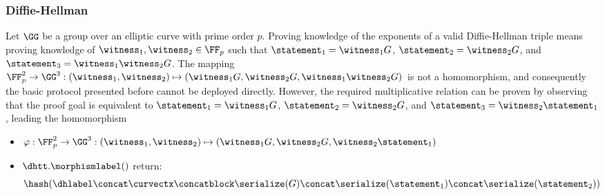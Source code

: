 \documentclass[11pt]{article}
\begin{document}
\subsubsection{Diffie-Hellman}
Let $\GG$ be a group over an elliptic curve with prime order $p$.
Proving knowledge of the exponents of a valid Diffie-Hellman triple means proving knowledge of $\witness_1,\witness_2\in\FF_p$ such that $\statement_1=\witness_1G$, $\statement_2=\witness_2G$, and $\statement_3=\witness_1 \witness_2 G$.
The mapping $\FF_p^2\to\GG^3:(\witness_1,\witness_2)\mapsto (\witness_1G,\witness_2G,\witness_1\witness_2G)$ is not a homomorphism, and consequently the basic protocol presented before cannot be deployed directly.
However, the required multiplicative relation can be proven by observing that the proof goal is equivalent to $\statement_1=\witness_1G$, $\statement_2=\witness_2G$, and $\statement_3=\witness_2\statement_1$, leading the homomorphism

\begin{itemize}
  \item  $\varphi:\FF_p^2\to\GG^3:(\witness_1,\witness_2)\mapsto(\witness_1G,\witness_2G,\witness_2\statement_1)$
  \item $\dhtt.\morphismlabel()$ return:
  \[
    \hash(\dhlabel \concat \curvectx \concatblock \serialize(G) \concat \serialize(\statement_1) \concat \serialize(\statement_2))
  \]
\end{itemize}
\end{document}
